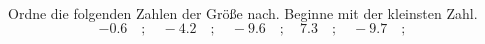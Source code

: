 \begin{aufgabe} ~ \\ 
Ordne die folgenden Zahlen der Gr\"o\ss{}e nach. Beginne mit der kleinsten Zahl.\[-0.6\quad ; \quad-4.2\quad ; \quad-9.6\quad ; \quad7.3\quad ; \quad-9.7\quad ; \quad\]\end{aufgabe} 

